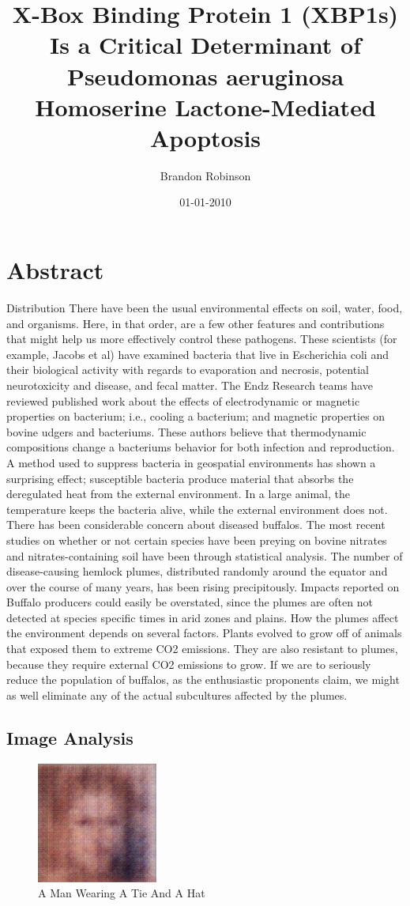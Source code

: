 \documentclass{article}%
\title{X{-}Box Binding Protein 1 (XBP1s) Is a Critical Determinant of Pseudomonas aeruginosa Homoserine Lactone{-}Mediated Apoptosis}%
\author{Brandon Robinson}%
\affil{Department of Nephrology, University of California, San Francisco, San Francisco, California, United States of America}%
\date{01{-}01{-}2010}%
\begin{document}
%
\normalsize%
\maketitle%
\section{Abstract}%
\label{sec:Abstract}%
Distribution\newline%
There have been the usual environmental effects on soil, water, food, and organisms. Here, in that order, are a few other features and contributions that might help us more effectively control these pathogens.\newline%
These scientists (for example, Jacobs et al) have examined bacteria that live in Escherichia coli and their biological activity with regards to evaporation and necrosis, potential neurotoxicity and disease, and fecal matter.\newline%
The Endz Research teams have reviewed published work about the effects of electrodynamic or magnetic properties on bacterium; i.e., cooling a bacterium; and magnetic properties on bovine udgers and bacteriums. These authors believe that thermodynamic compositions change a bacteriums behavior for both infection and reproduction.\newline%
A method used to suppress bacteria in geospatial environments has shown a surprising effect; susceptible bacteria produce material that absorbs the deregulated heat from the external environment. In a large animal, the temperature keeps the bacteria alive, while the external environment does not.\newline%
There has been considerable concern about diseased buffalos. The most recent studies on whether or not certain species have been preying on bovine nitrates and nitrates{-}containing soil have been through statistical analysis. The number of disease{-}causing hemlock plumes, distributed randomly around the equator and over the course of many years, has been rising precipitously. Impacts reported on Buffalo producers could easily be overstated, since the plumes are often not detected at species specific times in arid zones and plains. How the plumes affect the environment depends on several factors. Plants evolved to grow off of animals that exposed them to extreme CO2 emissions. They are also resistant to plumes, because they require external CO2 emissions to grow. If we are to seriously reduce the population of buffalos, as the enthusiastic proponents claim, we might as well eliminate any of the actual subcultures affected by the plumes.

%
\subsection{Image Analysis}%
\label{subsec:ImageAnalysis}%


\begin{figure}[h!]%
\centering%
\includegraphics[width=150px]{500_fake_images/samples_5_402.png}%
\caption{A Man Wearing A Tie And A Hat}%
\end{figure}

%
\end{document}
